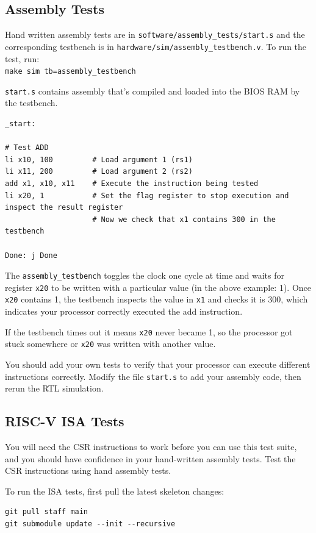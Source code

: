 \documentclass[11pt]{article}
\begin{document}
\subsection{Assembly Tests}
\label{assembly_tests}
Hand written assembly tests are in \verb|software/assembly_tests/start.s| and the corresponding testbench is in \verb|hardware/sim/assembly_testbench.v|.
To run the test, run:\\
\verb|make sim tb=assembly_testbench|

\verb|start.s| contains assembly that's compiled and loaded into the BIOS RAM by the testbench.
\begin{verbatim}
_start:

# Test ADD
li x10, 100         # Load argument 1 (rs1)
li x11, 200         # Load argument 2 (rs2)
add x1, x10, x11    # Execute the instruction being tested
li x20, 1           # Set the flag register to stop execution and inspect the result register
                    # Now we check that x1 contains 300 in the testbench

Done: j Done
\end{verbatim}

The \verb|assembly_testbench| toggles the clock one cycle at time and waits for register \verb|x20| to be written with a particular value (in the above example: 1).
Once \verb|x20| contains 1, the testbench inspects the value in \verb|x1| and checks it is 300, which indicates your processor correctly executed the add instruction.

If the testbench times out it means \verb|x20| never became 1, so the processor got stuck somewhere or \verb|x20| was written with another value.

You should add your own tests to verify that your processor can execute different instructions correctly. Modify the file \verb|start.s| to add your assembly code, then rerun the RTL simulation.

\subsection{RISC-V ISA Tests}\label{riscv-isa-tests}
You will need the CSR instructions to work before you can use this test suite, and you should have confidence in your hand-written assembly tests.
Test the CSR instructions using hand assembly tests.

To run the ISA tests, first pull the latest skeleton changes:
\begin{verbatim}
git pull staff main
git submodule update --init --recursive
\end{verbatim}
\end{document}
